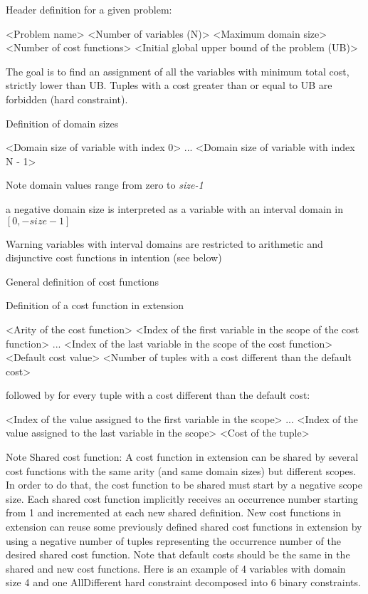 \documentclass{article}
\begin{document}
\begin{DoxyItemize}
\item Header definition for a given problem\-: \begin{DoxyVerb}<Problem name>
<Number of variables (N)>
<Maximum domain size>
<Number of cost functions>
<Initial global upper bound of the problem (UB)>
\end{DoxyVerb}
 The goal is to find an assignment of all the variables with minimum total cost, strictly lower than U\-B. Tuples with a cost greater than or equal to U\-B are forbidden (hard constraint).
\item Definition of domain sizes \begin{DoxyVerb}<Domain size of variable with index 0>
...
<Domain size of variable with index N - 1>
\end{DoxyVerb}
 \begin{DoxyNote}{Note}
domain values range from zero to {\itshape size-\/1} 

a negative domain size is interpreted as a variable with an interval domain in $[0,-size-1]$ 
\end{DoxyNote}
\begin{DoxyWarning}{Warning}
variables with interval domains are restricted to arithmetic and disjunctive cost functions in intention (see below)
\end{DoxyWarning}

\item General definition of cost functions
\begin{DoxyItemize}
\item Definition of a cost function in extension \begin{DoxyVerb}<Arity of the cost function>
<Index of the first variable in the scope of the cost function>
...
<Index of the last variable in the scope of the cost function>
<Default cost value>
<Number of tuples with a cost different than the default cost>
\end{DoxyVerb}
 followed by for every tuple with a cost different than the default cost\-: \begin{DoxyVerb}<Index of the value assigned to the first variable in the scope>
...
<Index of the value assigned to the last variable in the scope>
<Cost of the tuple>
\end{DoxyVerb}
 \begin{DoxyNote}{Note}
Shared cost function\-: A cost function in extension can be shared by several cost functions with the same arity (and same domain sizes) but different scopes. In order to do that, the cost function to be shared must start by a negative scope size. Each shared cost function implicitly receives an occurrence number starting from 1 and incremented at each new shared definition. New cost functions in extension can reuse some previously defined shared cost functions in extension by using a negative number of tuples representing the occurrence number of the desired shared cost function. Note that default costs should be the same in the shared and new cost functions. Here is an example of 4 variables with domain size 4 and one All\-Different hard constraint decomposed into 6 binary constraints.
\end{DoxyNote}


\end{DoxyItemize}
\end{DoxyItemize}
\end{document}
